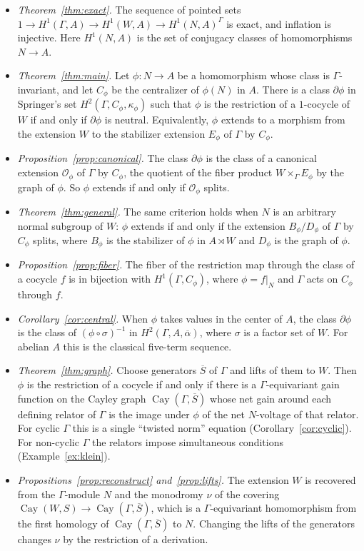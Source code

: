 \documentclass[12pt,letterpaper]{article}
\numberwithin{equation}{section}
\theoremstyle{plain}
\theoremstyle{definition}
\DeclareMathOperator{\Cay}{Cay}
\begin{document}
\begin{itemize}[itemsep=2pt]
\item \emph{Theorem~\ref{thm:exact}.} The sequence of pointed sets
$1\to H^1(\Gamma,A)\to H^1(W,A)\to H^1(N,A)^\Gamma$ is exact, and inflation
is injective. Here $H^1(N,A)$ is the set of conjugacy classes of
homomorphisms $N\to A$.
\item \emph{Theorem~\ref{thm:main}.} Let $\phi:N\to A$ be a homomorphism
whose class is $\Gamma$-invariant, and let $C_\phi$ be the centralizer of
$\phi(N)$ in $A$. There is a class $\partial\phi$ in Springer's set
$H^2(\Gamma,C_\phi,\kappa_\phi)$ such that $\phi$ is the restriction of a
$1$-cocycle of $W$ if and only if $\partial\phi$ is neutral. Equivalently,
$\phi$ extends to a morphism from the extension $W$ to the stabilizer
extension $E_\phi$ of $\Gamma$ by $C_\phi$.
\item \emph{Proposition~\ref{prop:canonical}.} The class $\partial\phi$
is the class of a canonical extension $\mathcal{O}_\phi$ of $\Gamma$ by
$C_\phi$, the quotient of the fiber product $W\times_\Gamma E_\phi$ by the
graph of $\phi$. So $\phi$ extends if and only if $\mathcal{O}_\phi$
splits.
\item \emph{Theorem~\ref{thm:general}.} The same criterion holds when $N$
is an arbitrary normal subgroup of $W$: $\phi$ extends if and only if the
extension $B_\phi/D_\phi$ of $\Gamma$ by $C_\phi$ splits, where $B_\phi$ is
the stabilizer of $\phi$ in $A\rtimes W$ and $D_\phi$ is the graph of
$\phi$.
\item \emph{Proposition~\ref{prop:fiber}.} The fiber of the restriction map
through the class of a cocycle $f$ is in bijection with
$H^1(\Gamma,C_\phi)$, where $\phi=f|_N$ and $\Gamma$ acts on $C_\phi$
through $f$.
\item \emph{Corollary~\ref{cor:central}.} When $\phi$ takes values in the
center of $A$, the class $\partial\phi$ is the class of
$(\phi\circ\sigma)^{-1}$ in $H^2(\Gamma,A,\overline{\alpha})$, where $\sigma$
is a factor set of $W$. For abelian $A$ this is the classical five-term
sequence.
\item \emph{Theorem~\ref{thm:graph}.} Choose generators $\overline{S}$ of
$\Gamma$ and lifts of them to $W$. Then $\phi$ is the restriction of a
cocycle if and only if there is a $\Gamma$-equivariant gain function on the
Cayley graph $\Cay(\Gamma,\overline{S})$ whose net gain around each
defining relator of $\Gamma$ is the image under $\phi$ of the net
$N$-voltage of that relator. For cyclic $\Gamma$ this is a single
``twisted norm'' equation (Corollary~\ref{cor:cyclic}). For non-cyclic
$\Gamma$ the relators impose simultaneous conditions
(Example~\ref{ex:klein}).
\item \emph{Propositions~\ref{prop:reconstruct} and~\ref{prop:lifts}.}
The extension $W$ is recovered from the $\Gamma$-module $N$ and the
monodromy $\nu$ of the covering $\Cay(W,S)\to\Cay(\Gamma,\overline{S})$,
which is a $\Gamma$-equivariant homomorphism from the first homology of
$\Cay(\Gamma,\overline{S})$ to $N$. Changing the lifts of the generators
changes $\nu$ by the restriction of a derivation.
\end{itemize}
\end{document}
